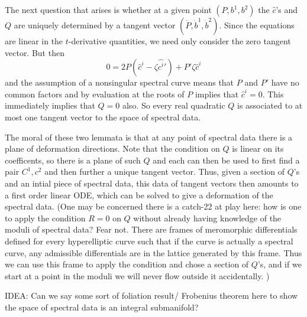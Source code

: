 The next question that arises is whether at a given point $(P,b^1,b^2)$ the $\hat c$'s and $Q$ are uniquely determined by a tangent vector $(\dot P, \dot b^1, \dot b^2)$. Since the equations are linear in the $t$-derivative quantities, we need only consider the zero tangent vector. But then
\[
0 = 2P\left( \hat c^i - \zeta\hat {c^i}'\right) + P'\zeta\hat c^i
\]
and the assumption of a nonsingular spectral curve means that $P$ and $P'$ have no common factors and by evaluation at the roots of $P$ implies that $\hat c^i=0$. This immediately implies that $Q=0$ also. So every real quadratic $Q$ is associated to at most one tangent vector to the space of spectral data.

The moral of these two lemmata is that at any point of spectral data there is a plane of deformation directions. Note that the condition on $Q$ is linear on its coefficents, so there is a plane of such $Q$ and each can then be used to first find a pair $C^1,c^2$ and then further a unique tangent vector. Thus, given a section of $Q$'s and an intial piece of spectral data, this data of tangent vectors then amounts to a first order linear ODE, which can be solved to give a deformation of the spectral data. (One may be concerned there is a catch-22 at play here: how is one to apply the condition $R=0$ on $Q$ without already having knowledge of the moduli of spectral data? Fear not. There are frames of meromorphic differentials defined for every hyperelliptic curve such that if the curve is actually a spectral curve, any admissible differentials are in the lattice generated by this frame. Thus we can use this frame to apply the condition and chose a section of $Q$'s, and if we start at a point in the moduli we will never flow outside it accidentally. )

IDEA: Can we say some sort of foliation result/ Frobenius theorem here to show the space of spectral data is an integral submanifold? 







